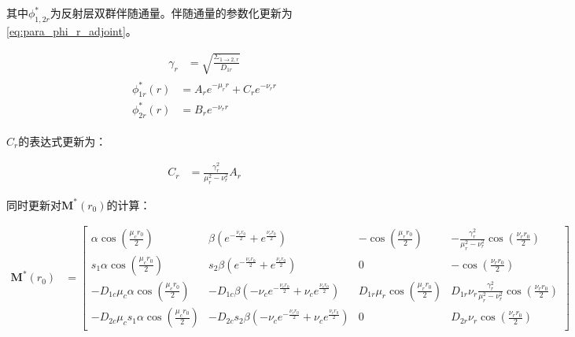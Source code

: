 其中$\phi_{1,2r}^*$为反射层双群伴随通量。伴随通量的参数化更新为\ref{eq:para_phi_r_adjoint}。

\begin{align}
    \gamma_r &= \sqrt{\frac{\Sigma_{1\rightarrow 2,r}}{D_{1r}}}
\end{align}
\begin{align}
    \label{eq:para_phi_r_adjoint}
    \begin{split}
        \phi_{1r}^*(r) &= A_r e^{-\mu_r r} + C_r e^{-\nu_r r} \\
        \phi_{2r}^*(r) &= B_r e^{-\nu_r r}
    \end{split}
\end{align}

$C_r$的表达式更新为：

\begin{align}
    C_r &= \frac{\gamma_r^2}{\mu_r^2 - \nu_r^2}A_r
\end{align}

同时更新对$\pmb{M}^*(r_0)$的计算：

\begin{align}
    \pmb{M}^*(r_0) &= 
    \begin{bmatrix}
        \alpha\cos(\frac{\mu_c r_0}{2}) & \beta(e^{-\frac{\nu_c r_0}{2}}+e^{\frac{\nu_c r_0}{2}}) & -\cos(\frac{\mu_r r_0}{2}) & -\frac{\gamma_r^2}{\mu_r^2 - \nu_r^2}\cos(\frac{\nu_r r_0}{2}) \\
        s_1\alpha\cos(\frac{\mu_c r_0}{2}) & s_2\beta(e^{-\frac{\nu_c r_0}{2}}+e^{\frac{\nu_c r_0}{2}}) & 0 & -\cos(\frac{\nu_r r_0}{2}) \\
        -D_{1c}\mu_c\alpha\cos(\frac{\mu_c r_0}{2}) & -D_{1c}\beta(-\nu_c e^{-\frac{\nu_c r_0}{2}}+\nu_c e^{\frac{\nu_c r_0}{2}}) & D_{1r}\mu_r\cos(\frac{\mu_r r_0}{2}) & D_{1r}\nu_r\frac{\gamma_r^2}{\mu_r^2 - \nu_r^2}\cos(\frac{\nu_r r_0}{2}) \\
        -D_{2c}\mu_c s_1\alpha\cos(\frac{\mu_c r_0}{2}) & -D_{2c}s_2\beta(-\nu_c e^{-\frac{\nu_c r_0}{2}}+\nu_c e^{\frac{\nu_c r_0}{2}}) & 0 & D_{2r}\nu_r \cos(\frac{\nu_r r_0}{2})
    \end{bmatrix}
\end{align}
